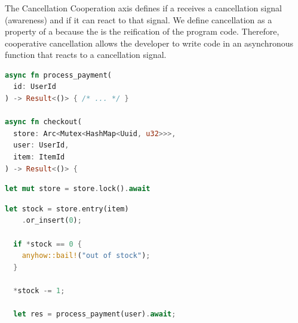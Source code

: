 


\subsubsection{\Cooperation}
\label{ssec:designdims:cooperation}

The Cancellation Cooperation axis defines if a \coro receives a cancellation signal (awareness) and if it can react to that signal. We define cancellation as a property of a \coro because the \coro is the reification of the program code. Therefore, cooperative cancellation allows the developer to write code in an asynchronous function that reacts to a cancellation signal.


\begin{lrbox}{\aastateA}
\begin{lstlisting}[language=Rust,numbers=none]
async fn process_payment(
  id: UserId
) -> Result<()> { /* ... */ }

async fn checkout(
  store: Arc<Mutex<HashMap<Uuid, u32>>>,
  user: UserId,
  item: ItemId
) -> Result<()> {
\end{lstlisting}
\end{lrbox}

\begin{lrbox}{\aastateB}
\begin{lstlisting}[language=Rust,numbers=none]
  let mut store = store.lock().await
\end{lstlisting}
\end{lrbox}

\begin{lrbox}{\aastateC}
\begin{lstlisting}[language=Rust,numbers=none]
  let stock = store.entry(item)
    .or_insert(0);

  if *stock == 0 {
    anyhow::bail!("out of stock");
  }

  *stock -= 1;

  let res = process_payment(user).await;
\end{lstlisting}
\end{lrbox}

